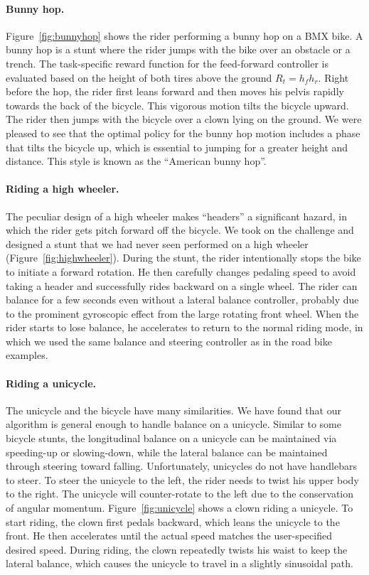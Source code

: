 \paragraph{Bunny hop.} Figure~\ref{fig:bunnyhop} shows the rider performing a bunny hop on a BMX bike. A bunny hop is a stunt where the rider jumps with the bike over an obstacle or a trench. The task-specific reward function for the feed-forward controller is evaluated based on the height of both tires above the ground $R_t=h_fh_r$. Right before the hop, the rider first leans forward and then moves his pelvis rapidly towards the back of the bicycle. This vigorous motion tilts the bicycle upward. The rider then jumps with the bicycle over a clown lying on the ground. We were pleased to see that the optimal policy for the bunny hop motion includes a phase that tilts the bicycle up, which is essential to jumping for a greater height and distance. This style is known as the ``American bunny hop''.

\paragraph{Riding a high wheeler.} The peculiar design of a high wheeler makes ``headers'' a significant hazard, in which the rider gets pitch forward off the bicycle. We took on the challenge and designed a stunt that we had never seen performed on a high wheeler (Figure~\ref{fig:highwheeler}). During the stunt, the rider intentionally stops the bike to initiate a forward rotation. He then carefully changes pedaling speed to avoid taking a header and successfully rides backward on a single wheel. The rider can balance for a few seconds even without a lateral balance controller, probably due to the prominent gyroscopic effect from the large rotating front wheel. When the rider starts to lose balance, he accelerates to return to the normal riding mode, in which we used the same balance and steering controller as in the road bike examples.

\paragraph{Riding a unicycle.} The unicycle and the bicycle have many similarities. We have found that our algorithm is general enough to handle balance on a unicycle. Similar to some bicycle stunts, the longitudinal balance on a unicycle can be maintained via speeding-up or slowing-down, while the lateral balance can be maintained through steering toward falling. Unfortunately, unicycles do not have handlebars to steer. To steer the unicycle to the left, the rider needs to twist his upper body to the right. The unicycle will counter-rotate to the left due to the conservation of angular momentum. Figure~\ref{fig:unicycle} shows a clown riding a unicycle. To start riding, the clown first pedals backward, which leans the unicycle to the front. He then accelerates until the actual speed matches the user-specified desired speed. During riding, the clown repeatedly twists his waist to keep the lateral balance, which causes the unicycle to travel in a slightly sinusoidal path.



